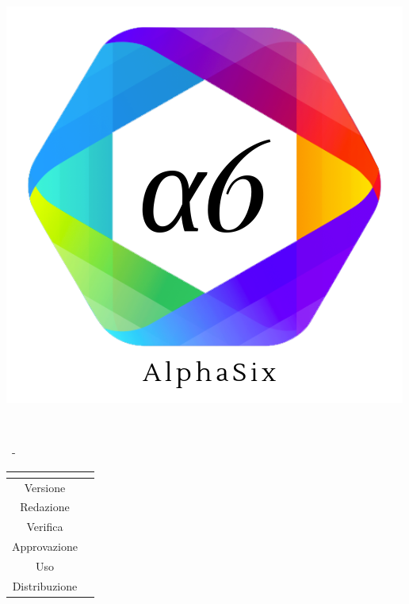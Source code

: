\documentclass[a4paper, oneside, openany]{article}
\begin{document}
\begin{titlepage}
	\begin{center}
		
		\begin{center}
			\centerline{\includegraphics[scale=0.24]{icons/a6.png}}
		\end{center}
		
		\vspace{1cm}
		
		\begin{Huge}
			\textbf{\Titolo} \\
		\end{Huge}
		
		\vspace{9pt}  
		
		\begin{large}
			\Gruppo \ - \Data
		\end{large}	  
		
		\vspace{15pt}
		
		\bgroup
		\def\arraystretch{1.3}
		\centering
		\begin{tabular}{c|L{5cm}}
			 \\ \hline
			Versione &  \Versione \\
			Redazione & \ACapoRedazione \ & \Verifica \ & \Approvazione \ & \Uso \ & \Distribuzione
		\end{tabular}
		\egroup
		

\end{center}
\end{titlepage}
\end{document}
